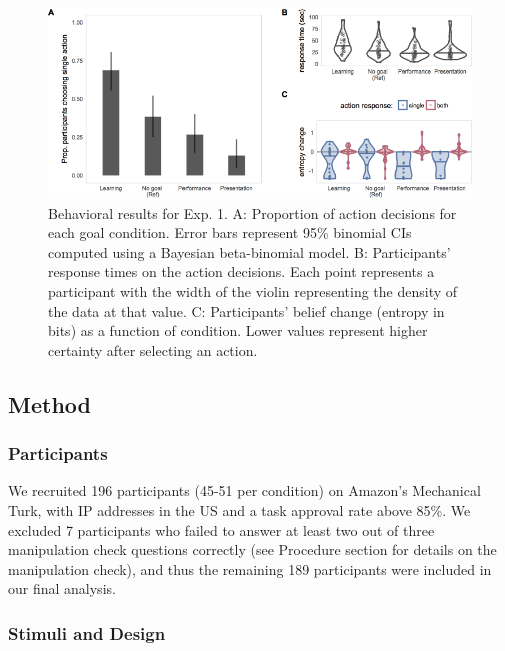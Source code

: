 \documentclass[10pt, letterpaper]{article}
\newenvironment{CodeChunk}{}{}
\begin{document}
\begin{CodeChunk}
\begin{figure}[tb]

{\centering \includegraphics[width=0.95\linewidth]{figs/e1_behav_results_plot-1} 

}

\caption[Behavioral results for Exp]{Behavioral results for Exp. 1. A: Proportion of action decisions for each goal condition. Error bars represent 95\% binomial CIs computed using a Bayesian beta-binomial model. B: Participants' response times on the action decisions. Each point represents a participant with the width of the violin representing the density of the data at that value. C: Participants' belief change (entropy in bits) as a function of condition. Lower values represent higher certainty after selecting an action.}\label{fig:e1_behav_results_plot}
\end{figure}
\end{CodeChunk}

\subsection{Method}\label{method}

\subsubsection{Participants}\label{participants}

We recruited 196 participants (45-51 per condition) on Amazon's
Mechanical Turk, with IP addresses in the US and a task approval rate
above 85\%. We excluded 7 participants who failed to answer at least two
out of three manipulation check questions correctly (see Procedure
section for details on the manipulation check), and thus the remaining
189 participants were included in our final analysis.

\subsubsection{Stimuli and Design}\label{stimuli-and-design}
\end{document}
